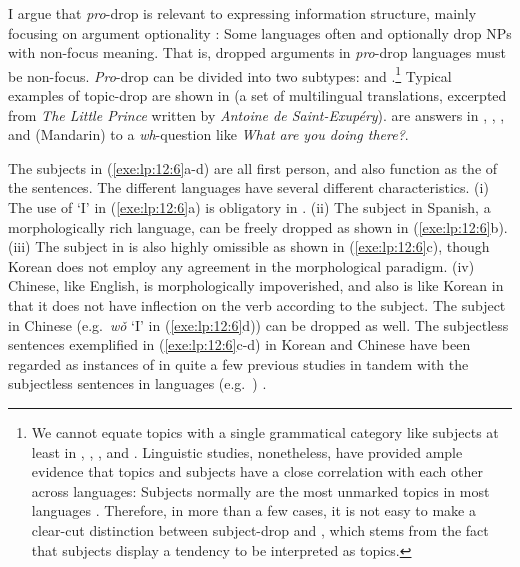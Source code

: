 I argue that \textit{pro}-drop is relevant to expressing information
structure, mainly focusing on argument optionality
 \citep{saleem:10,saleem:bender:10}: Some
languages often and optionally drop NPs with non-focus meaning. That
is, dropped arguments in \textit{pro}-drop languages must be
non-focus.  \textit{Pro}-drop can be divided into two subtypes:
 and .\footnote{We cannot equate
  topics with a single grammatical category like subjects at least in
  , , , and
  . Linguistic studies, nonetheless, have provided ample
  evidence that topics and subjects have a close correlation with each
  other across languages: Subjects normally are the most unmarked
  topics in most languages
  \citep{lambrecht:96,erteschik:07}. Therefore, in more than a few
  cases, it is not easy to make a clear-cut distinction between
  subject-drop and , which stems from the fact that
  subjects display a tendency to be interpreted as topics.}  Typical
examples of topic-drop are shown in  (a set of
multilingual translations, excerpted from \textit{The Little Prince}
written by \textit{Antoine de Saint-Exup{\'e}ry}). 
are answers in , , , and
(Mandarin)  to a \textit{wh}-question like \textit{What
  are you doing there?}.



\noindent The subjects in (\ref{exe:lp:12:6}a-d) are all first person,
and also function as the  of the sentences. The different
languages have several different characteristics.  (i) The use of `I'
in (\ref{exe:lp:12:6}a) is obligatory in .  (ii) The
subject in Spanish, a morphologically rich language, can be freely
dropped as shown in (\ref{exe:lp:12:6}b). (iii) The subject in
 is also highly omissible as shown in
(\ref{exe:lp:12:6}c), though Korean does not employ any agreement in
the morphological paradigm. (iv) Chinese, like English, is
morphologically impoverished, and also is like Korean in that it does
not have inflection on the verb according to the subject. The subject
in Chinese (e.g.\ \textit{w\v{o}} `I' in (\ref{exe:lp:12:6}d)) can be
dropped as well.  The subjectless sentences exemplified in
(\ref{exe:lp:12:6}c-d) in Korean and Chinese have been regarded as
instances of  in quite a few previous studies in
tandem with the subjectless sentences in  languages
(e.g.\ )
\citep{li:thompson:76,huang:84,yang:02,alonso:etal:02}.


